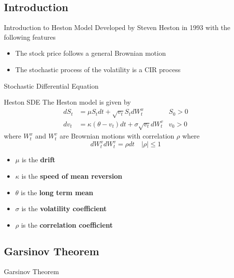\subsection{Introduction}
\begin{frame}{Introduction to Heston Model}
	Developed by Steven Heston in 1993 with the following features
	\begin{itemize}
		\item The stock price follows a general Brownian motion
		\item The stochastic process of the volatility is a CIR process
	\end{itemize}
\end{frame}

\begin{frame}{Stochastic Differential Equation}
	\begin{block}{Heston SDE}
		The Heston model is given by
		\begin{align*}
			dS_t &= \mu S_t dt + \sqrt{v_t} S_t dW_t^x & S_0 > 0 \\
			dv_t &= \kappa(\theta - v_t)dt + \sigma \sqrt{v_t} dW_t^v & v_0 > 0
		\end{align*}
		where \( W_t^x \) and \( W_t^v \) are Brownian motions with correlation
		\( \rho \) where \[ dW_t^x dW_t^v = \rho dt \quad |\rho| \leq 1 \]
	\end{block}
	\begin{itemize}
		\item \( \mu \) is the \textbf{drift}
		\item \( \kappa \) is the \textbf{speed of mean reversion}
		\item \( \theta \) is the \textbf{long term mean}
		\item \( \sigma \) is the \textbf{volatility coefficient}
		\item \( \rho \) is the \textbf{correlation coefficient}
	\end{itemize}
\end{frame}

\subsection{Garsinov Theorem}
\begin{frame}{Garsinov Theorem}
	\begin{theorem}

	\end{theorem}
\end{frame}

